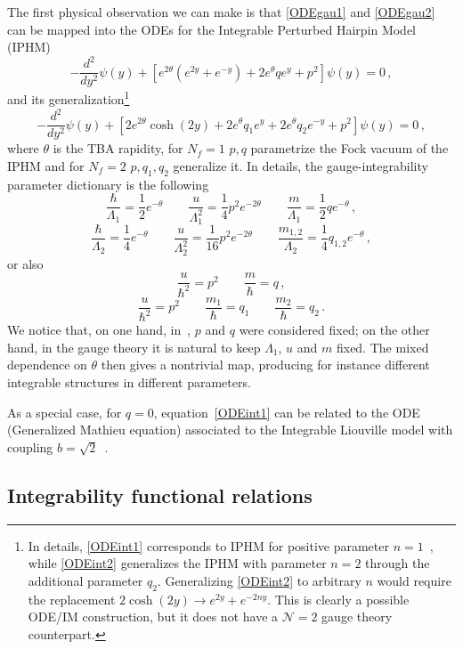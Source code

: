 \documentclass[11pt,a4paper]{elsarticle}
\def \th {\theta}
\newcommand{\be}{\begin{equation}}
\newcommand{\ee}{\end{equation}}
\def\th{\theta}
\numberwithin{figure}{section}
\numberwithin{table}{section}
\begin{document}
The first physical observation we can make is that \eqref{ODEgau1} and \eqref{ODEgau2} can be mapped into the ODEs for the Integrable Perturbed Hairpin Model (IPHM)~\cite{FateevLukyanov:2005}
\be \label{ODEint1}
-\frac{d^2}{dy^2} \psi(y) + [e^{2\th} (e^{2y}+e^{-y}) +2 e^\theta q  e^y + p^2] \psi(y)  = 0 \,,
\ee 
and its generalization\footnote{In details, \eqref{ODEint1} corresponds to IPHM for positive parameter $n=1$~\cite{FateevLukyanov:2005}, while \eqref{ODEint2} generalizes the IPHM with parameter $n=2$ through the additional parameter $q_2$. Generalizing \eqref{ODEint2} to arbitrary $n$ would require the replacement $ 2 \cosh (2 y) \to e^{2y}+ e^{-2n y}$. This is clearly a possible ODE/IM construction, but it does not have a $\mathcal N=2$ gauge theory counterpart.}
\be \label{ODEint2}
-\frac{d^2}{dy^2} \psi(y) + [2e^{2\th} \cosh (2y) + 2e^\theta q_1 e^y + 2e^\theta q_2 e^{-y}+ p^2] \psi(y)  = 0 \,,
\ee 
where $\th$ is the TBA rapidity, for $N_f=1$ $p,q$ parametrize the Fock vacuum of the IPHM and for $N_f=2$ $p,q_1,q_2$ generalize it. In details, the gauge-integrability parameter dictionary is the following
\be \label{DictGau1}
\frac{\hbar}{\Lambda_1} = \frac{1}{2} e^{-\th} \qquad \frac{u}{\Lambda_1^2} = \frac{1}{4} p^2 e^{-2\th} \qquad \frac{m}{\Lambda_1} = \frac{1}{2} q e^{-\th}\,,
\ee 
\be \label{DictGau2}
\frac{\hbar}{\Lambda_2} = \frac{1}{4} e^{-\th} \qquad \frac{u}{\Lambda_2^2} = \frac{1}{16} p^2 e^{-2\th} \qquad \frac{m_{1,2}}{\Lambda_2} = \frac{1}{4} q_{1,2} e^{-\th}\,,
\ee 
or also
\be 
\frac{u}{\hbar^2} = p^2  \qquad \frac{m}{\hbar} = q\,,
\ee 
\be 
\frac{u}{\hbar^2} = p^2  \qquad \frac{m_1}{\hbar} = q_1 \qquad \frac{m_2}{\hbar} = q_2\,.
\ee
We notice that, on one hand, in~\cite{FateevLukyanov:2005}, $p$ and $q$ were considered fixed; on the other hand, in the gauge theory it is natural to keep $\Lambda_1$, $u$ and $m$ fixed. The mixed dependence on $\th$ then gives a nontrivial map, producing for instance different integrable structures in different parameters.

As a special case, for $q=0$, equation~\eqref{ODEint1} can be related to the ODE (Generalized Mathieu equation) associated to the Integrable Liouville model with coupling $b=\sqrt{2}$~\cite{GrassiHaoNeitzke:2021,FioravantiGregori:2019,ZamolodchikovMemorial}. 


\subsection{Integrability functional relations}
\end{document}
